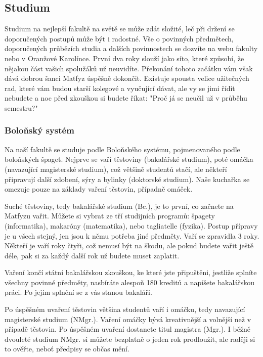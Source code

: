 \subsection{Studium}
Studium na nejlepší fakultě na světě se může zdát složité, leč při držení se doporučených postupů může být i radostné.
Vše o povinných předmětech, doporučených průbězích studia a dalších povinnostech se dozvíte na webu fakulty nebo v
Oranžové Karolínce. První dva roky slouží jako síto, které způsobí, že nějakou část vašich spolužáků už neuvidíte.
Překonání tohoto začátku vám však dává dobrou šanci Matfyz úspěšně dokončit. Existuje spousta velice užitečných rad,
které vám budou starší kolegové a vyučující dávat, ale vy se jimi řídit nebudete a noc před zkouškou si budete říkat:
"Proč já se neučil už v průběhu semestru?"


\subsubsection{Boloňský systém}
Na naší fakultě se studuje podle Boloňského systému, pojmenovaného podle boloňských špaget. Nejprve se vaří těstoviny
(bakalářské studium), poté omáčka (navazující magisterské studium), což většině studentů stačí, ale někteří připravují
další zdobení, sýry a bylinky (doktorské studium). Naše kuchařka se omezuje pouze na základy vaření těstovin, případně
omáček.

Suché těstoviny, tedy bakalářské studium (Bc.), je to první, co začnete na Matfyzu vařit. Můžete si vybrat ze tří
studijních programů: špagety (informatika), makaróny (matematika), nebo tagliatelle (fyzika). Postup přípravy je u všech
stejný, jen jsou k němu potřeba jiné předměty. Vaří se zpravidla 3 roky. Někteří je vaří roky čtyři, což nemusí být na
škodu, ale pokud budete vařit ještě déle, pak si za každý další rok už budete muset zaplatit.

Vaření končí státní bakalářskou zkouškou, ke které jste připuštěni, jestliže splníte všechny povinné předměty, nasbíráte
alespoň 180 kreditů a napíšete bakalářskou práci. Po jejím splnění se z vás stanou bakaláři.

Po úspěšném uvaření těstovin většina studentů vaří i omáčku, tedy navazující magisterské studium (NMgr.). Vaření omáčky
bývá kreativnější a volnější než v případě těstovin. Po úspěšném uvaření dostanete titul magistra (Mgr.). I běžně
dvouleté studium NMgr. si můžete bezplatně o jeden rok prodloužit, ale raději si to ověřte, neboť předpisy se občas
mění.


